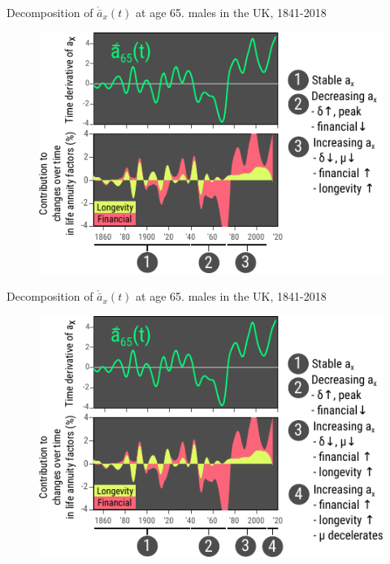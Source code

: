 \documentclass[10pt]{beamer}
\begin{document}
\begin{frame}{Decomposition of $\acute{\bar{a}}_x(t)$ at age 65. males in the UK, 1841-2018}
\begin{figure}
	\centering
	\hspace*{-0.9cm}
	\includegraphics[scale=1.45] {Fig401.pdf}
\end{figure}
\end{frame}

\begin{frame}{Decomposition of $\acute{\bar{a}}_x(t)$ at age 65. males in the UK, 1841-2018}
\begin{figure}
	\centering
	\hspace*{-0.9cm}
	\includegraphics[scale=1.45] {Fig40.pdf}
\end{figure}
\end{frame}
\end{document}
